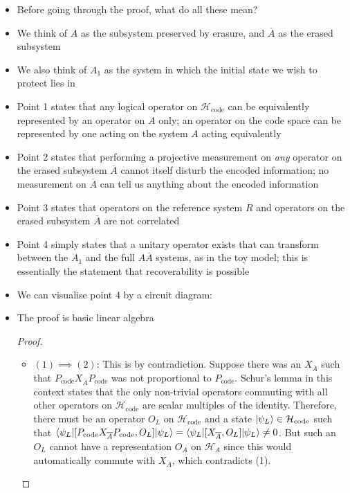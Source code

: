 \documentclass[12pt,a4paper]{article}
\numberwithin{equation}{section}
\newcommand{\Pc}{P_{\text{code}}}
\newcommand{\Hcode}{\mathcal{H}_{\text{code}}}
\begin{document}
	\begin{itemize}
		\item Before going through the proof, what do all these mean?
		\item We think of $A$ as the subsystem preserved by erasure, and $\overline{A}$ as the erased subsystem
		\item We also think of $A_{1}$ as the system in which the initial state we wish to protect lies in
		\item Point 1 states that any logical operator on $\Hcode$ can be equivalently represented by an operator on $A$ only; an operator on the code space can be represented by one acting on the system $A$ acting equivalently
		\item Point 2 states that performing a projective measurement on \textit{any} operator on the erased subsystem $\overline{A}$ cannot itself disturb the encoded information; no measurement on $\overline{A}$ can tell us anything about the encoded information
		\item Point 3 states that operators on the reference system $R$ and operators on the erased subsystem $\overline{A}$ are not correlated
		\item Point 4 simply states that a unitary operator exists that can transform between the $A_{1}$ and the full $A\overline{A}$ systems, as in the toy model; this is essentially the statement that recoverability is possible
		\item We can visualise point 4 by a circuit diagram:
		\begin{figure}[H] 
			\centering
		\end{figure}
		\item The proof is basic linear algebra
		\newcommand{\Xabar}{X_{\overline{A}}}
		\begin{proof}
			\begin{itemize}
				\item $(1)\implies (2)$: This is by contradiction. Suppose there was an $X_{\overline{A}}$ such that $\Pc X_{\overline{A}}\Pc$ was not proportional to $\Pc$. Schur's lemma in this context states that the only non-trivial operators commuting with all other operators on $\Hcode$ are scalar multiples of the identity. Therefore, there must be an operator $O_{L}$ on $\Hcode$ and a state $\ket{\psi_{L}}\in\Hcode$ such that $\braket{\psi_{L}|[\Pc X_{\overline{A}}\Pc,O_{L}]|\psi_{L}}=\braket{\psi_{L}|[X_{\overline{A}},O_{L}]|\psi_{L}}\neq 0$. But such an $O_{L}$ cannot have a representation $O_{A}$ on $\mathcal{H}_{A}$ since this would automatically commute with $X_{\overline{A}}$, which contradicts (1).

\end{itemize}
\end{proof}
\end{itemize}
\end{document}
